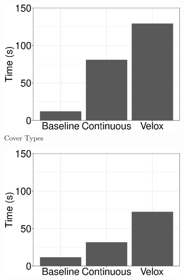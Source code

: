 \documentclass{vldb}
\begin{document}
\begin{figure}[h]
	\centering
\begin{subfigure}[b]{0.5\columnwidth}
	\includegraphics[width=\linewidth, height=\linewidth,keepaspectratio]{../images/experiment-results/cover-types-times.eps}
	\caption{Cover Types}
	\label{fig:cover-types-times}
\end{subfigure}%
\begin{subfigure}[b]{0.5\columnwidth}
  	\includegraphics[width=\linewidth, height=\linewidth,keepaspectratio]{../images/experiment-results/higgs-sample-times.eps}

\end{subfigure}
\end{figure}
\end{document}
